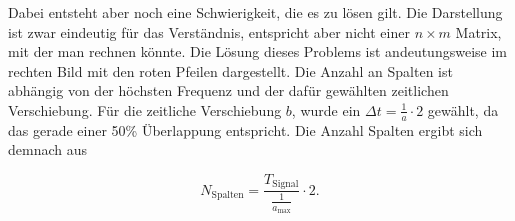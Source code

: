 Dabei entsteht aber noch eine Schwierigkeit, die es zu lösen gilt. Die Darstellung ist zwar eindeutig für das Verständnis, entspricht aber nicht einer $n \times m$ Matrix, mit der man rechnen könnte.
Die Lösung dieses Problems ist andeutungsweise im rechten Bild mit den roten Pfeilen dargestellt. Die Anzahl an Spalten ist abhängig von der höchsten Frequenz und der dafür gewählten zeitlichen Verschiebung.
Für die zeitliche Verschiebung $b$, wurde ein $\Delta t=\frac{1}{a}\cdot2$ gewählt, da das gerade einer 50\% Überlappung entspricht. Die Anzahl Spalten ergibt sich demnach aus

\begin{equation}
	N_\text{Spalten}=\frac{T_\text{Signal}}{\frac{1}{a_\text{max}}}\cdot2.
	\label{wavelets:equation7}
\end{equation}


